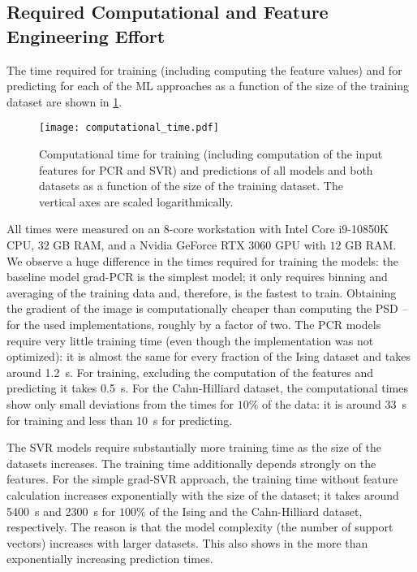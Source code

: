 \documentclass[11pt, authoryear]{elsarticle}
\begin{document}
	\subsection{Required Computational and Feature Engineering Effort}
	The time required for training (including computing the feature values) and 
	for predicting for each of the \gls{ML} approaches as a function of the size 
	of the training dataset are shown in \cref{fig:comp_time}.
	\begin{figure}
		\centering
		\texttt{[image: computational\_time.pdf]}
		\caption{Computational time for training (including computation of the
			input features for PCR and SVR) and predictions of all models and both
			datasets as a function of the size of the training dataset. The 
			vertical axes are scaled logarithmically.}
		\label{fig:comp_time}
	\end{figure}
	All times were measured on an 8-core workstation with Intel Core i9-10850K CPU,  $32$ GB RAM, 
	and a Nvidia GeForce RTX 3060 GPU with $12$ GB RAM. We observe a huge difference 
	in the times required for training the models: the baseline model 
	grad-PCR is the simplest model; it only requires 
	binning and averaging of the training data and, therefore, is the fastest 
	to train. Obtaining the gradient of the image is computationally cheaper 
	than computing the \gls{PSD} -- for the used implementations, roughly by a factor of two. 
	The PCR models require very little training time (even though the 
	implementation was not optimized): it is almost the same for every 
	fraction of the Ising dataset and takes around \SI{1.2}{\second}.
	For training, excluding the computation of the features and predicting 
	it takes \SI{0.5}{\second}. 
	For the Cahn-Hilliard dataset, the computational times show only small
	deviations from the times for $10\%$ of the data: it is
	around \SI{33}{\second} for training and less than \SI{10}{\second} for 
	predicting.
	
	The \gls{SVR} models require substantially more training time as the size
	of the datasets increases. The training time additionally depends strongly 
	on the features. For the simple grad-SVR approach, the training time without
	feature calculation increases exponentially with the size of the dataset; 
	it takes around \SI{5400}{\second} and \SI{2300}{\second} for $100 \%$ of 
	the Ising and the Cahn-Hilliard dataset, respectively. The reason is that 
	the model complexity (the number of support vectors) increases with larger
	datasets. This also shows in the more than exponentially increasing 
	prediction times.
	
\end{document}
